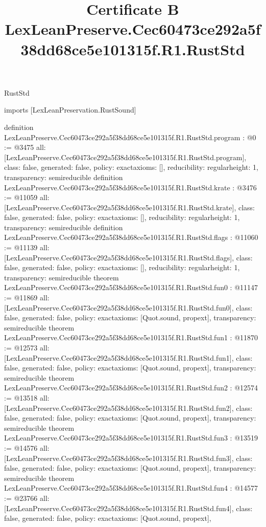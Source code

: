 \begin{lexlean}{RustStd}
\title{Certificate B LexLeanPreserve.Cec60473ce292a5f38dd68ce5e101315f.R1.RustStd}
\begin{coremodule}
imports [LexLeanPreservation.RustSound]

definition LexLeanPreserve.Cec60473ce292a5f38dd68ce5e101315f.R1.RustStd.program : @0 := @3475 {
  all: [LexLeanPreserve.Cec60473ce292a5f38dd68ce5e101315f.R1.RustStd.program],
  class: false,
  generated: false,
  policy: exact{axioms: []},
  reducibility: regular{height: 1},
  transparency: semireducible
}
definition LexLeanPreserve.Cec60473ce292a5f38dd68ce5e101315f.R1.RustStd.krate : @3476 := @11059 {
  all: [LexLeanPreserve.Cec60473ce292a5f38dd68ce5e101315f.R1.RustStd.krate],
  class: false,
  generated: false,
  policy: exact{axioms: []},
  reducibility: regular{height: 1},
  transparency: semireducible
}
definition LexLeanPreserve.Cec60473ce292a5f38dd68ce5e101315f.R1.RustStd.flags : @11060 := @11139 {
  all: [LexLeanPreserve.Cec60473ce292a5f38dd68ce5e101315f.R1.RustStd.flags],
  class: false,
  generated: false,
  policy: exact{axioms: []},
  reducibility: regular{height: 1},
  transparency: semireducible
}
theorem LexLeanPreserve.Cec60473ce292a5f38dd68ce5e101315f.R1.RustStd.fun0 : @11147 := @11869 {
  all: [LexLeanPreserve.Cec60473ce292a5f38dd68ce5e101315f.R1.RustStd.fun0],
  class: false,
  generated: false,
  policy: exact{axioms: [Quot.sound, propext]},
  transparency: semireducible
}
theorem LexLeanPreserve.Cec60473ce292a5f38dd68ce5e101315f.R1.RustStd.fun1 : @11870 := @12573 {
  all: [LexLeanPreserve.Cec60473ce292a5f38dd68ce5e101315f.R1.RustStd.fun1],
  class: false,
  generated: false,
  policy: exact{axioms: [Quot.sound, propext]},
  transparency: semireducible
}
theorem LexLeanPreserve.Cec60473ce292a5f38dd68ce5e101315f.R1.RustStd.fun2 : @12574 := @13518 {
  all: [LexLeanPreserve.Cec60473ce292a5f38dd68ce5e101315f.R1.RustStd.fun2],
  class: false,
  generated: false,
  policy: exact{axioms: [Quot.sound, propext]},
  transparency: semireducible
}
theorem LexLeanPreserve.Cec60473ce292a5f38dd68ce5e101315f.R1.RustStd.fun3 : @13519 := @14576 {
  all: [LexLeanPreserve.Cec60473ce292a5f38dd68ce5e101315f.R1.RustStd.fun3],
  class: false,
  generated: false,
  policy: exact{axioms: [Quot.sound, propext]},
  transparency: semireducible
}
theorem LexLeanPreserve.Cec60473ce292a5f38dd68ce5e101315f.R1.RustStd.fun4 : @14577 := @23766 {
  all: [LexLeanPreserve.Cec60473ce292a5f38dd68ce5e101315f.R1.RustStd.fun4],
  class: false,
  generated: false,
  policy: exact{axioms: [Quot.sound, propext]},
}
\end{coremodule}
\end{lexlean}
